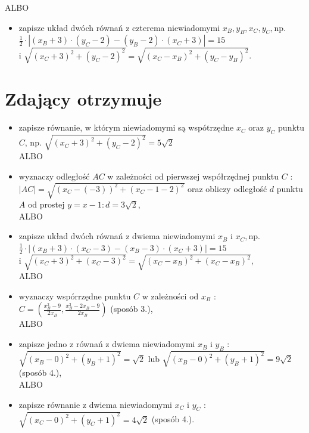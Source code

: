 \documentclass[10pt]{article}
\begin{document}
ALBO

\begin{itemize}
  \item zapisze układ dwóch równań z czterema niewiadomymi $x_{B}, y_{B}, x_{C}, y_{C}, \mathrm{np}$.\\
$\frac{1}{2} \cdot\left|\left(x_{B}+3\right) \cdot\left(y_{C}-2\right)-\left(y_{B}-2\right) \cdot\left(x_{C}+3\right)\right|=15$\\
i $\sqrt{\left(x_{C}+3\right)^{2}+\left(y_{C}-2\right)^{2}}=\sqrt{\left(x_{C}-x_{B}\right)^{2}+\left(y_{C}-y_{B}\right)^{2}}$.
\end{itemize}

\section*{Zdający otrzymuje}
\begin{itemize}
  \item zapisze równanie, w którym niewiadomymi są wspótrzędne $x_{C}$ oraz $y_{C}$ punktu $C$, np. $\sqrt{\left(x_{C}+3\right)^{2}+\left(y_{C}-2\right)^{2}}=5 \sqrt{2}$\\
ALBO
  \item wyznaczy odległość $A C$ w zależności od pierwszej współrzędnej punktu $C$ : $|A C|=\sqrt{\left(x_{C}-(-3)\right)^{2}+\left(x_{C}-1-2\right)^{2}}$ oraz obliczy odległość $d$ punktu $A$ od prostej $y=x-1: d=3 \sqrt{2}$,\\
ALBO
  \item zapisze układ dwóch równań z dwiema niewiadomymi $x_{B}$ i $x_{C}, \mathrm{np}$.\\
$\frac{1}{2} \cdot\left|\left(x_{B}+3\right) \cdot\left(x_{C}-3\right)-\left(x_{B}-3\right) \cdot\left(x_{C}+3\right)\right|=15$\\
i $\sqrt{\left(x_{C}+3\right)^{2}+\left(x_{C}-3\right)^{2}}=\sqrt{\left(x_{C}-x_{B}\right)^{2}+\left(x_{C}-x_{B}\right)^{2}}$,\\
ALBO
  \item wyznaczy wspórrzędne punktu $C$ w zależności od $x_{B}$ :\\
$C=\left(\frac{x_{B}^{2}-9}{2 x_{B}}, \frac{x_{B}^{2}-2 x_{B}-9}{2 x_{B}}\right)$ (sposób 3.),\\
ALBO
  \item zapisze jedno z równań z dwiema niewiadomymi $x_{B}$ i $y_{B}$ :\\
$\sqrt{\left(x_{B}-0\right)^{2}+\left(y_{B}+1\right)^{2}}=\sqrt{2}$ lub $\sqrt{\left(x_{B}-0\right)^{2}+\left(y_{B}+1\right)^{2}}=9 \sqrt{2}$ (sposób 4.),\\
ALBO
  \item zapisze równanie z dwiema niewiadomymi $x_{C}$ i $y_{C}$ :\\
$\sqrt{\left(x_{C}-0\right)^{2}+\left(y_{C}+1\right)^{2}}=4 \sqrt{2}$ (sposób 4.).
\end{itemize}
\end{document}
